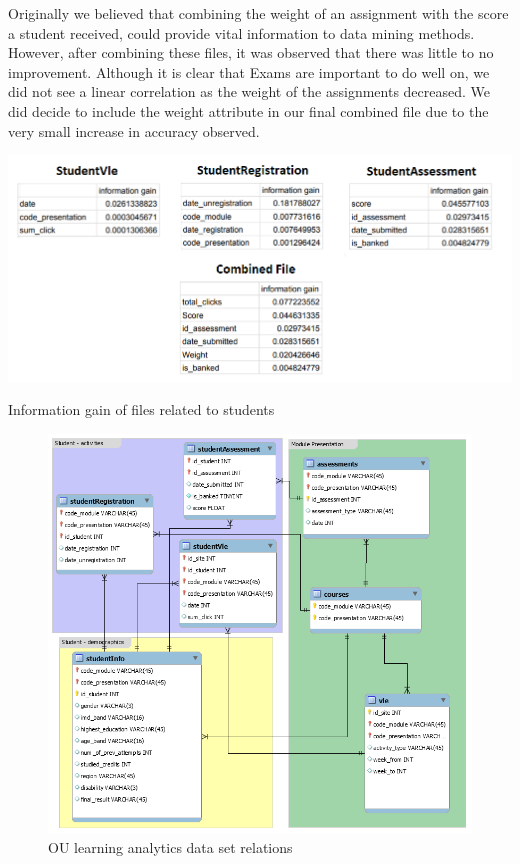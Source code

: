 \documentclass[12pt]{article}
\begin{document}
 Originally we believed that combining the weight of an assignment with the score a student received, could provide vital information to data mining methods. However, after combining these files, it was observed that there was little to no improvement. Although it is clear that Exams are important to do well on, we did not see a linear correlation as the weight of the assignments decreased. We did decide to include the weight attribute in our final combined file due to the very small increase in accuracy observed.
 
 \begin{table}[h]
 \centering
 \includegraphics[scale=.75]{chart.png}
 \caption{Information gain of files related to students \cite{oulad}}
 \label{fig:chart}
 \end{table}
 
 \begin{figure}[h]
 \centering
 \includegraphics[scale=0.5]{db_model.png}
 \caption{OU learning analytics data set relations \cite{oulad}}
 \label{fig:db_model}
 \end{figure}
\end{document}

